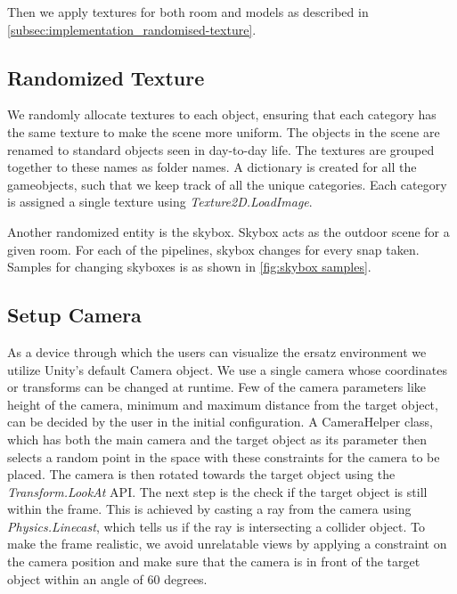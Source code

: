 Then we apply textures for both room and models as described in \autoref{subsec:implementation_randomised-texture}.

\subsection{Randomized Texture}\label{subsec:implementation_randomised-texture}
We randomly allocate textures to each object, ensuring that each category has the same texture to make the scene more uniform.
The objects in the scene are renamed to standard objects seen in day-to-day life.
The textures are grouped together to these names as folder names.
A dictionary is created for all the gameobjects, such that we keep track of all the unique categories.
Each category is assigned a single texture using \emph{Texture2D.LoadImage}.

Another randomized entity is the skybox.
Skybox acts as the outdoor scene for a given room.
For each of the pipelines, skybox changes for every snap taken.
Samples for changing skyboxes is as shown in \autoref{fig:skybox samples}.

\subsection{Setup Camera}\label{subsec:implementation_camera}
As a device through which the users can visualize the ersatz environment we utilize Unity's default Camera object.
We use a single camera whose coordinates or transforms can be changed at runtime.
Few of the camera parameters like height of the camera, minimum and maximum distance from the target object, can be decided by the user in the initial configuration.
A CameraHelper class, which has both the main camera and the target object as its parameter then selects a random point in the space with these constraints for the camera to be placed.
The camera is then rotated towards the target object using the \emph{Transform.LookAt} API.
The next step is the check if the target object is still within the frame.
This is achieved by casting a ray from the camera using \emph{Physics.Linecast}, which tells us if the ray is intersecting a collider object.
To make the frame realistic, we avoid unrelatable views by applying a constraint on the camera position and make sure that the camera is in front of the target object within an angle of 60 degrees.

